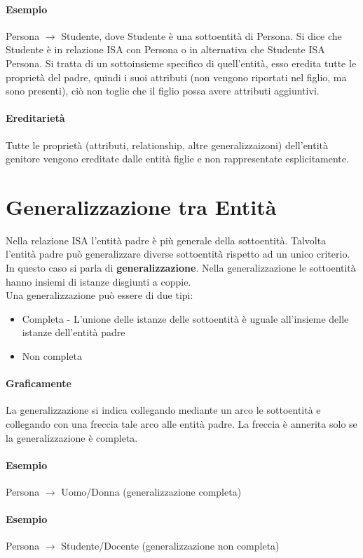 \paragraph*{Esempio}Persona $\rightarrow$ Studente, dove Studente è una sottoentità
di Persona. Si dice che Studente è in relazione ISA con Persona o in alternativa
che Studente ISA Persona.
Si tratta di un sottoinsieme specifico di quell'entità, esso eredita tutte le
proprietà del padre, quindi i suoi attributi (non vengono riportati nel figlio, ma sono
presenti), ciò non toglie che il figlio possa avere attributi aggiuntivi.
\paragraph*{Ereditarietà} Tutte le proprietà (attributi, relationship, altre generalizzaizoni)
dell'entità genitore vengono ereditate dalle entità figlie e non rappresentate
esplicitamente.
\section{Generalizzazione tra Entità}
Nella relazione ISA l'entità padre è più generale della sottoentità. Talvolta
l'entità padre può generalizzare diverse sottoentità rispetto ad un unico
criterio. In questo caso si parla di \textbf{generalizzazione}.
Nella generalizzazione le sottoentità hanno insiemi di istanze disgiunti a coppie.
\\ Una generalizzazione può essere di due tipi:
\begin{itemize}
    \item Completa - L'unione delle istanze delle sottoentità è uguale all'insieme
    delle istanze dell'entità padre
    \item Non completa
\end{itemize}
\paragraph*{Graficamente} La generalizzazione si indica collegando
mediante un arco le sottoentità e collegando con una freccia tale arco alle entità
padre. La freccia è annerita solo se la generalizzazione è completa.
\paragraph*{Esempio} Persona $\rightarrow$ Uomo/Donna (generalizzazione completa)
\paragraph*{Esempio} Persona $\rightarrow$ Studente/Docente (generalizzazione non completa)

